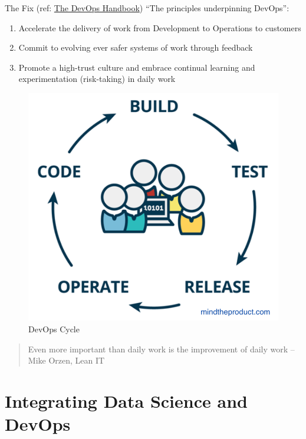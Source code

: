 \documentclass[]{book}
\providecommand{\tightlist}{%
  \setlength{\itemsep}{0pt}\setlength{\parskip}{0pt}}
\theoremstyle{definition}
\theoremstyle{definition}
\theoremstyle{definition}
\theoremstyle{remark}
\begin{document}
The Fix (ref:
\href{https://www.amazon.com/dp/1942788002/ref=cm_sw_r_tw_dp_U_x_bUwpCbBTAM8HQ}{The
DevOps Handbook}) ``The principles underpinning DevOps'':

\begin{enumerate}
\def\labelenumi{\arabic{enumi}.}
\tightlist
\item
  Accelerate the delivery of work from Development to Operations to
  customers
\item
  Commit to evolving ever safer systems of work through feedback
\item
  Promote a high-trust culture and embrace continual learning and
  experimentation (risk-taking) in daily work
\end{enumerate}

\begin{figure}
\centering
\includegraphics{imgs/devops/code-devops.png}
\caption{DevOps Cycle}
\end{figure}

\begin{quote}
Even more important than daily work is the improvement of daily work
--Mike Orzen, Lean IT
\end{quote}

\hypertarget{integrating-data-science-and-devops}{%
\section{Integrating Data Science and
DevOps}\label{integrating-data-science-and-devops}}
\end{document}
